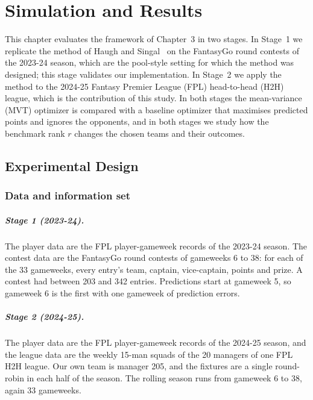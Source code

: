 \providecommand{\tbd}[1]{\textbf{[TBD: #1]}}

\chapter{Simulation and Results}
\label{ch:results}

This chapter evaluates the framework of Chapter~3 in two stages. In Stage~1 we replicate the
method of Haugh and Singal~\cite{haugh2021} on the FantasyGo round contests of the 2023-24
season, which are the pool-style setting for which the method was designed; this stage
validates our implementation. In Stage~2 we apply the method to the 2024-25 Fantasy Premier
League (FPL) head-to-head (H2H) league, which is the contribution of this study. In both stages
the mean-variance (MVT) optimizer is compared with a baseline optimizer that maximises
predicted points and ignores the opponents, and in both stages we study how the benchmark
rank $r$ changes the chosen teams and their outcomes.

\section{Experimental Design}
\label{sec:design}

\subsection{Data and information set}
\label{sec:design-data}

\paragraph{Stage 1 (2023-24).} The player data are the FPL player-gameweek records of the
2023-24 season. The contest data are the FantasyGo round contests of gameweeks 6 to 38: for
each of the 33 gameweeks, every entry's team, captain, vice-captain, points and prize. A contest
had between 203 and 342 entries. Predictions start at gameweek 5, so gameweek 6 is the first
with one gameweek of prediction errors.

\paragraph{Stage 2 (2024-25).} The player data are the FPL player-gameweek records of the
2024-25 season, and the league data are the weekly 15-man squads of the 20 managers of one FPL
H2H league. Our own team is manager 205, and the fixtures are a single round-robin in each half
of the season. The rolling season runs from gameweek 6 to 38, again 33 gameweeks.

